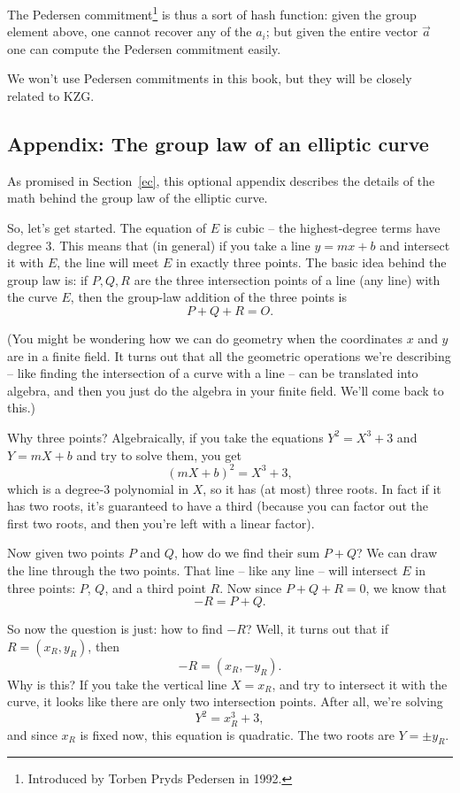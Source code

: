 The Pedersen commitment\footnote{Introduced by Torben Pryds Pedersen in 1992.} is thus a sort of hash function: given the group
element above, one cannot recover any of the $a_{i}$; but given the
entire vector $\overrightarrow{a}$ one can compute the Pedersen
commitment easily.

We won't use Pedersen commitments in this book, but they will be
closely related to KZG.

\subsection{Appendix: The group law of an elliptic curve}
\label{appendix-ec-mult}

As promised in Section~\ref{ec},
this optional appendix describes the details of the math
behind the group law of the elliptic curve.

So, let's get started. The equation of $E$ is cubic -- the
highest-degree terms have degree $3$. This means that (in general) if
you take a line $y = mx + b$ and intersect it with $E$, the line
will meet $E$ in exactly three points. The basic idea behind the group
law is: if $P,Q,R$ are the three intersection points of a line (any
line) with the curve $E$, then the group-law addition of the three
points is \[P + Q + R = O.\]

(You might be wondering how we can do geometry when the coordinates
$x$ and $y$ are in a finite field. It turns out that all the
geometric operations we're describing -- like finding the intersection
of a curve with a line -- can be translated into algebra, and then you
just do the algebra in your finite field. We'll come back to this.)

Why three points? Algebraically, if you take the equations
$Y^{2} = X^{3} + 3$ and $Y = mX + b$ and try to solve them, you get
\[(mX + b)^{2} = X^{3} + 3,\] which is a degree-3 polynomial in $X$,
so it has (at most) three roots. In fact if it has two roots, it's
guaranteed to have a third (because you can factor out the first two
roots, and then you're left with a linear factor).

Now given two points $P$ and $Q$, how do we find their sum
$P + Q$? We can draw the line through the two points. That line --
like any line -- will intersect $E$ in three points: $P$, $Q$, and
a third point $R$. Now since $P + Q + R = 0$, we know that
\[- R = P + Q.\]

So now the question is just: how to find $- R$? Well, it turns out
that if $R = ( x_{R},y_{R} )$, then
\[- R = ( x_{R}, - y_{R} ).\] Why is this? If you take the
vertical line $X = x_{R}$, and try to intersect it with the curve, it
looks like there are only two intersection points. After all, we're
solving \[Y^{2} = x_{R}^{3} + 3,\] and since $x_{R}$ is fixed now,
this equation is quadratic. The two roots are $Y = \pm y_{R}$.

